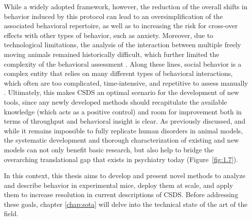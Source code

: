 While a widely adopted framework, however, the reduction of the overall shifts in behavior induced by this protocol can lead to an oversimplification of the associated behavioral repertoire, as well as to increasing the risk for cross-over effects with other types of behavior, such as anxiety. Moreover, due to technological limitations, the analysis of the interaction between multiple freely moving animals remained historically difficult, which further limited the complexity of the behavioral assessment \cite{Shemesh2023ANeuroethology}. Along these lines, social behavior is a complex entity that relies on many different types of behavioral interactions, which often are too complicated, time-intensive, and repetitive to assess manually \cite{Bordes2023AutomaticallyStress}. Ultimately, this makes CSDS an optimal scenario for the development of new tools, since any newly developed methods should recapitulate the available knowledge (which acts as a positive control) and room for improvement both in terms of throughput and behavioral insight is clear. As previously discussed, and while it remains impossible to fully replicate human disorders in animal models, the systematic development and thorough characterization of existing and new models can not only benefit basic research, but also help to bridge the overarching translational gap that exists in psychiatry today \cite{Shemesh2023ANeuroethology} (Figure~\ref{fig:1.7}).

In this context, this thesis aims to develop and present novel methods to analyze and describe behavior in experimental mice, deploy them at scale, and apply them to increase resolution in current descriptions of CSDS. Before addressing these goals, chapter \ref{chap:sota} will delve into the technical state of the art of the field.
